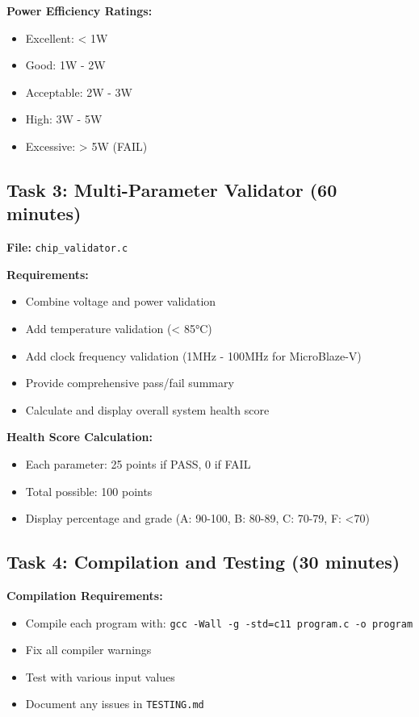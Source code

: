 \documentclass[11pt,a4paper]{article}
\begin{document}
\textbf{Power Efficiency Ratings:}
\begin{itemize}
    \item Excellent: < 1W
    \item Good: 1W - 2W
    \item Acceptable: 2W - 3W
    \item High: 3W - 5W
    \item Excessive: > 5W (FAIL)
\end{itemize}

\subsection{Task 3: Multi-Parameter Validator (60 minutes)}

\textbf{File:} \texttt{chip\_validator.c}

\textbf{Requirements:}
\begin{itemize}
    \item Combine voltage and power validation
    \item Add temperature validation (< 85°C)
    \item Add clock frequency validation (1MHz - 100MHz for MicroBlaze-V)
    \item Provide comprehensive pass/fail summary
    \item Calculate and display overall system health score
\end{itemize}

\textbf{Health Score Calculation:}
\begin{itemize}
    \item Each parameter: 25 points if PASS, 0 if FAIL
    \item Total possible: 100 points
    \item Display percentage and grade (A: 90-100, B: 80-89, C: 70-79, F: <70)
\end{itemize}

\subsection{Task 4: Compilation and Testing (30 minutes)}

\textbf{Compilation Requirements:}
\begin{itemize}
    \item Compile each program with: \texttt{gcc -Wall -g -std=c11 program.c -o program}
    \item Fix all compiler warnings
    \item Test with various input values
    \item Document any issues in \texttt{TESTING.md}
\end{itemize}
\end{document}
